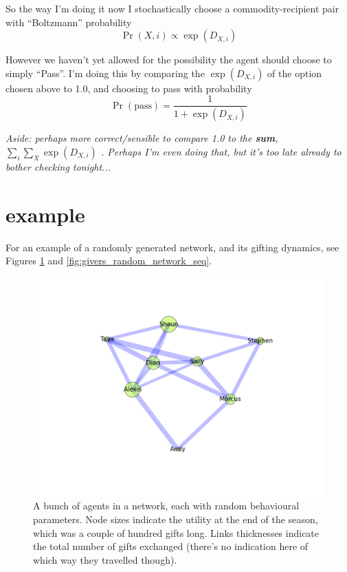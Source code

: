 \documentclass[11pt]{article}
\begin{document}
So the way I'm doing it now I stochastically choose a commodity-recipient pair with ``Boltzmann'' probability
\[
\Pr(X,i) \propto \exp (D_{X,i})
\]

However we haven't yet allowed for the possibility the agent should choose to simply ``Pass''.
I'm doing this by comparing the  $\exp (D_{X,i})$ of the option chosen above to 1.0, and choosing to pass with probability 
\[
\Pr(\text{pass}) = \frac{1}{1+\exp (D_{X,i})}
\]

{\it Aside: perhaps more correct/sensible to compare 1.0 to the {\bf sum},  $\sum_i \sum_X \exp (D_{X,i})$ . Perhaps I'm even doing that, but it's too late already to bother checking tonight...}

\section{example}

For an example of a randomly generated network, and its gifting dynamics, see Figures \ref{fig:givers_random_network_example} and \ref{fig:givers_random_network_seq}.

\begin{figure}[b]
\includegraphics[width=.85\textwidth]{givers_random_network_example}
\caption{\label{fig:givers_random_network_example} 
A bunch of agents in a network, each with random behavioural parameters.  Node sizes indicate the utility at the end of the season, which was a couple of hundred gifts long. Links thicknesses indicate the total number of gifts exchanged (there's no indication here of which way they travelled though).  }\end{figure}
\end{document}
